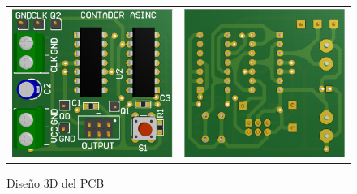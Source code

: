 \begin{figure}[H]
    \centering
    \begin{tabular}{c c}
        \includegraphics[scale=0.4]{../EJ7/Recursos/3d_top_asincronico.PNG} &
        \includegraphics[scale=0.4]{../EJ7/Recursos/3d_bottom_asincronico.PNG} 
    \end{tabular}
    \caption{Dise\~no 3D del PCB}
    \label{fig:3d_asincronico}
\end{figure}

